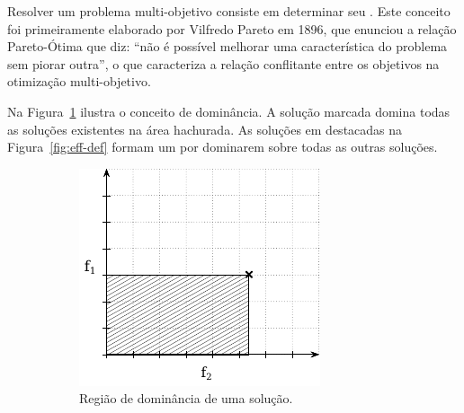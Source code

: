 Resolver um problema multi-objetivo consiste em determinar seu \paretoset{}.
Este conceito foi primeiramente elaborado por Vilfredo Pareto em 1896, que
enunciou a relação Pareto-Ótima que diz: ``não é possível melhorar uma característica
do problema sem piorar outra'', o que caracteriza a relação conflitante entre os
objetivos na otimização multi-objetivo.

Na Figura~\ref{fig:dom-def} ilustra o conceito de dominância.
A solução marcada domina todas as soluções existentes na área hachurada.
As soluções em destacadas na Figura~\ref{fig:eff-def} formam um \paretoset por
dominarem sobre todas as outras soluções.

\begin{figure}
    \centering
    \begin{subfigure}[t]{0.3\textwidth}
        \includegraphics[width=\textwidth]{img/mokp/dom-def}
        \caption{Região de dominância de uma solução.}
        \label{fig:dom-def}
    \end{subfigure}
    \qquad
    \begin{subfigure}[t]{0.3\textwidth}

\end{subfigure}
\end{figure}
